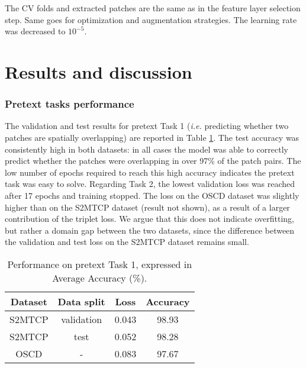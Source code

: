 \documentclass[runningheads]{llncs}
\begin{document}
The CV folds and extracted patches are the same as in the feature layer selection step. Same goes for optimization and augmentation strategies. The learning rate was decreased to $10^{-5}$. 
\section{Results and discussion}

\subsubsection{Pretext tasks performance} 
The validation and test results for pretext Task 1 (\emph{i.e.} predicting whether two patches are spatially overlapping) are reported in Table \ref{tab:results_pretexttask1}. The test accuracy was consistently high in both datasets: in all cases the model was able to correctly predict whether the patches were overlapping in over 97\% of the patch pairs. The low number of epochs required to reach this high accuracy indicates the pretext task was easy to solve. 
Regarding Task 2,  the lowest validation loss was reached after 17 epochs and training stopped. The loss on the OSCD dataset was slightly higher than on the S2MTCP dataset (result not shown), as a result of a larger contribution of the triplet loss. We argue that this does not indicate overfitting, but rather a domain gap between the two datasets, since the difference between the validation and test loss on the S2MTCP dataset remains small. 

\begin{table}
\caption{Performance on pretext Task 1, expressed in {Average} Accuracy (\%).}
\centering
\begin{tabular}{c|c|c|c} \hline
Dataset & Data split & Loss & Accuracy \\ \hline \hline
S2MTCP & validation & 0.043 & 98.93 \\
S2MTCP & test & 0.052 & 98.28 \\ 
OSCD & - & 0.083 & 97.67 \\
\hline
\end{tabular}
\label{tab:results_pretexttask1}
\end{table}
\end{document}

